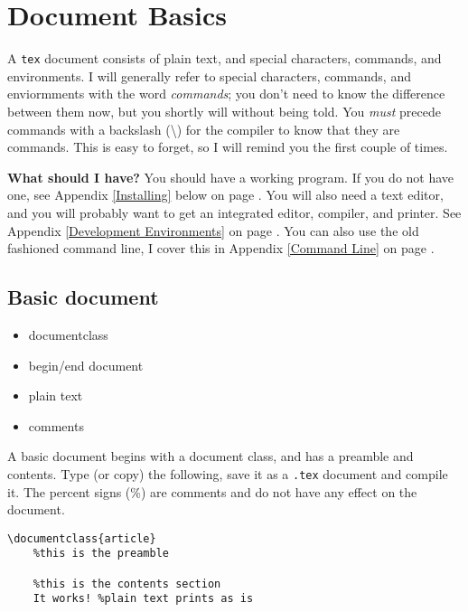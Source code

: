     \section{Document Basics}
    \label{Document-Basics}

    A \texttt{tex} document consists of plain text, and special characters, commands, and environments. I will generally refer to special characters, commands, and enviormments with the word \textit{commands}; you don't need to know the difference between them now, but you shortly will without being told. You \textit{must} precede commands with a backslash (\textbackslash{}) for the compiler to know that they are commands. This is easy to forget, so I will remind you the first couple of times.

    \textbf{What should I have?} You should have a working \Lx{} program. If you do not have one, see Appendix \ref{Installing} below on page \pageref{Installing}. You will also need a text editor, and you will probably want to get an integrated editor, compiler, and printer. See Appendix \ref{Development Environments} on page \pageref{Development Environments}. You can also use the old fashioned command line, I cover this in Appendix \ref{Command Line} on page \pageref{Command Line}.

        \subsection{Basic document}
        \label{Basic-document}
        
        \begin{cmd}
            \begin{itemize}
                \item{documentclass}
                \item{begin/end document}
				\item{plain text}
				\item{comments}
            \end{itemize}
        \end{cmd}

        A basic document begins with a document class, and has a preamble and contents. Type (or copy) the following, save it as a \texttt{.tex} document and compile it. The percent signs (\%) are comments and do not have any effect on  the document.

        \begin{verbatim}
\documentclass{article}
    %this is the preamble

    %this is the contents section
    It works! %plain text prints as is
    
        \end{verbatim}

